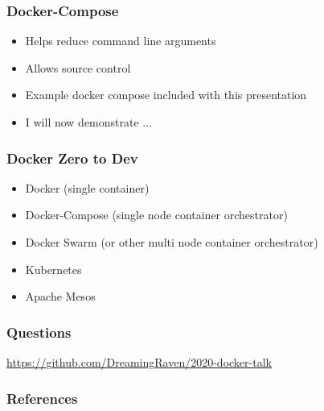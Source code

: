 \documentclass[aspectratio=169]{beamer}
\begin{document}
  \begin{frame}
    \frametitle{Docker-Compose}
    \begin{itemize}
        \item Helps reduce command line arguments
        \item Allows source control
        \item Example docker compose included with this presentation
        \item I will now demonstrate ...
    \end{itemize}
  \end{frame}

  \begin{frame}
    \frametitle{Docker Zero to Dev}
    \begin{itemize}
      \item Docker (single container)
      \item Docker-Compose (single node container orchestrator)
      \item Docker Swarm (or other multi node container orchestrator)
    \end{itemize}
    \begin{itemize}
      \item Kubernetes
      \item Apache Mesos
    \end{itemize}
  \end{frame}

  \begin{frame}
      \frametitle{Questions}
      \url{https://github.com/DreamingRaven/2020-docker-talk}
  \end{frame}

  \begin{frame}[allowframebreaks]
    \frametitle{References}
    \printbibliography
  \end{frame}
\end{document}
